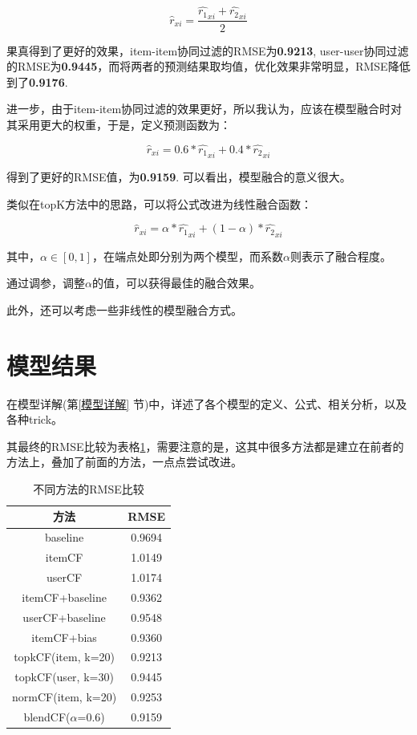 \documentclass[utf8, a4paper,12pt, onecolumn]{ctexart}
\begin{document}
\begin{spacing}{1.3}
\[\hat{r}_{xi} = \frac{\hat{r_1}_{xi} + \hat{r_2}_{xi}}{2}\]

果真得到了更好的效果，item-item协同过滤的RMSE为\textbf{0.9213}, user-user协同过滤的RMSE为\textbf{0.9445}，而将两者的预测结果取均值，优化效果非常明显，RMSE降低到了\textbf{0.9176}.

进一步，由于item-item协同过滤的效果更好，所以我认为，应该在模型融合时对其采用更大的权重，于是，定义预测函数为：

\[\hat{r}_{xi} = 0.6 * \hat{r_1}_{xi} + 0.4 * \hat{r_2}_{xi}\]

得到了更好的RMSE值，为\textbf{0.9159}. 可以看出，模型融合的意义很大。

类似在topK方法中的思路，可以将公式改进为线性融合函数：

\[\hat{r}_{xi} = \alpha * \hat{r_1}_{xi} + (1-\alpha) * \hat{r_2}_{xi}\]

其中，$\alpha \in [0, 1]$，在端点处即分别为两个模型，而系数$\alpha$则表示了融合程度。

通过调参，调整$\alpha$的值，可以获得最佳的融合效果。

此外，还可以考虑一些非线性的模型融合方式。

\section{模型结果}

在模型详解(第\ref{模型详解} 节)中，详述了各个模型的定义、公式、相关分析，以及各种trick。

其最终的RMSE比较为表格\ref{RMSE-table}，需要注意的是，这其中很多方法都是建立在前者的方法上，叠加了前面的方法，一点点尝试改进。

\begin{table}[h]\large
	\centering
	\caption{不同方法的RMSE比较}
	\label{RMSE-table}
	\begin{tabular}{|c|c|}
		\hline
		\textbf{方法} & \textbf{RMSE} \\
		\hline
		baseline &   0.9694 \\
		\hline
		itemCF &  1.0149 \\
		\hline
		userCF & 1.0174 \\
		\hline
		itemCF+baseline &  0.9362 \\
		\hline
		userCF+baseline & 0.9548 \\
		\hline
		itemCF+bias & 0.9360 \\
		\hline
		topkCF(item, k=20) & 0.9213 \\
		\hline
		topkCF(user, k=30) &0.9445 \\
		\hline
		normCF(item, k=20) &0.9253 \\
		\hline
		blendCF($\alpha$=0.6) & 0.9159 \\		
		\hline
	\end{tabular}


\end{table}
\end{spacing}
\end{document}
